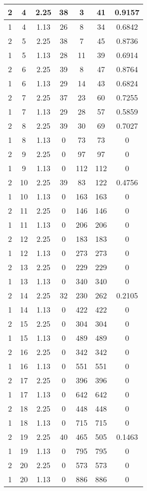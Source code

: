 \documentclass[letterpaper, 12pt]{article}
\begin{document}
\begin{longtable}{|c|c|c|c|c|c|c|}
\hline
2 & 4 & 2.25 & 38 & 3 & 41 & 0.9157 \\
\hline
1 & 4 & 1.13 & 26 & 8 & 34 & 0.6842 \\
\hline
2 & 5 & 2.25 & 38 & 7 & 45 & 0.8736 \\
\hline
1 & 5 & 1.13 & 28 & 11 & 39 & 0.6914 \\
\hline
2 & 6 & 2.25 & 39 & 8 & 47 & 0.8764 \\
\hline
1 & 6 & 1.13 & 29 & 14 & 43 & 0.6824 \\
\hline
2 & 7 & 2.25 & 37 & 23 & 60 & 0.7255 \\
\hline
1 & 7 & 1.13 & 29 & 28 & 57 & 0.5859 \\
\hline
2 & 8 & 2.25 & 39 & 30 & 69 & 0.7027 \\
\hline
1 & 8 & 1.13 & 0 & 73 & 73 & 0 \\
\hline
2 & 9 & 2.25 & 0 & 97 & 97 & 0 \\
\hline
1 & 9 & 1.13 & 0 & 112 & 112 & 0 \\
\hline
2 & 10 & 2.25 & 39 & 83 & 122 & 0.4756 \\
\hline
1 & 10 & 1.13 & 0 & 163 & 163 & 0 \\
\hline
2 & 11 & 2.25 & 0 & 146 & 146 & 0 \\
\hline
1 & 11 & 1.13 & 0 & 206 & 206 & 0 \\
\hline
2 & 12 & 2.25 & 0 & 183 & 183 & 0 \\
\hline
1 & 12 & 1.13 & 0 & 273 & 273 & 0 \\
\hline
2 & 13 & 2.25 & 0 & 229 & 229 & 0 \\
\hline
1 & 13 & 1.13 & 0 & 340 & 340 & 0 \\
\hline
2 & 14 & 2.25 & 32 & 230 & 262 & 0.2105 \\
\hline
1 & 14 & 1.13 & 0 & 422 & 422 & 0 \\
\hline
2 & 15 & 2.25 & 0 & 304 & 304 & 0 \\
\hline
1 & 15 & 1.13 & 0 & 489 & 489 & 0 \\
\hline
2 & 16 & 2.25 & 0 & 342 & 342 & 0 \\
\hline
1 & 16 & 1.13 & 0 & 551 & 551 & 0 \\
\hline
2 & 17 & 2.25 & 0 & 396 & 396 & 0 \\
\hline
1 & 17 & 1.13 & 0 & 642 & 642 & 0 \\
\hline
2 & 18 & 2.25 & 0 & 448 & 448 & 0 \\
\hline
1 & 18 & 1.13 & 0 & 715 & 715 & 0 \\
\hline
2 & 19 & 2.25 & 40 & 465 & 505 & 0.1463 \\
\hline
1 & 19 & 1.13 & 0 & 795 & 795 & 0 \\
\hline
2 & 20 & 2.25 & 0 & 573 & 573 & 0 \\
\hline
1 & 20 & 1.13 & 0 & 886 & 886 & 0 \\
\hline
\end{longtable}
\end{document}
